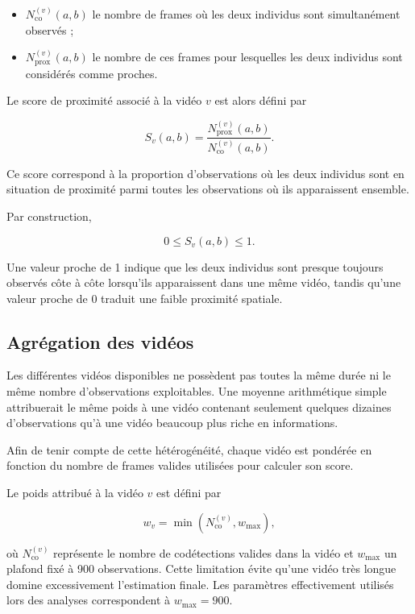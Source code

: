 \documentclass[11pt,a4paper]{report}
\begin{document}
\begin{itemize}
    \item $N_{\mathrm{co}}^{(v)}(a,b)$ le nombre de frames où les deux individus
    sont simultanément observés ;
    \item $N_{\mathrm{prox}}^{(v)}(a,b)$ le nombre de ces frames pour lesquelles
    les deux individus sont considérés comme proches.
\end{itemize}

Le score de proximité associé à la vidéo $v$ est alors défini par

\begin{equation}
S_v(a,b)
=
\frac{
N_{\mathrm{prox}}^{(v)}(a,b)}
{N_{\mathrm{co}}^{(v)}(a,b)}.
\end{equation}

Ce score correspond à la proportion d'observations où les deux individus sont
en situation de proximité parmi toutes les observations où ils apparaissent
ensemble.

Par construction,

\begin{equation}
0\leq S_v(a,b)\leq1.
\end{equation}

Une valeur proche de 1 indique que les deux individus sont presque toujours
observés côte à côte lorsqu'ils apparaissent dans une même vidéo, tandis qu'une
valeur proche de 0 traduit une faible proximité spatiale.

\subsection*{Agrégation des vidéos}

Les différentes vidéos disponibles ne possèdent pas toutes la même durée ni le
même nombre d'observations exploitables. Une moyenne arithmétique simple
attribuerait le même poids à une vidéo contenant seulement quelques dizaines
d'observations qu'à une vidéo beaucoup plus riche en informations.

Afin de tenir compte de cette hétérogénéité, chaque vidéo est pondérée en
fonction du nombre de frames valides utilisées pour calculer son score.

Le poids attribué à la vidéo $v$ est défini par

\begin{equation}
w_v
=
\min
\left(
N_{\mathrm{co}}^{(v)},
w_{\max}
\right),
\end{equation}

où $N_{\mathrm{co}}^{(v)}$ représente le nombre de codétections valides dans la
vidéo et $w_{\max}$ un plafond fixé à 900 observations. Cette limitation évite
qu'une vidéo très longue domine excessivement l'estimation finale. Les
paramètres effectivement utilisés lors des analyses correspondent à
$w_{\max}=900$. 
\end{document}
